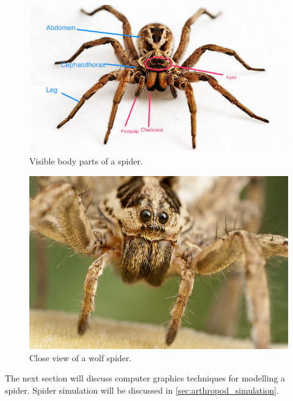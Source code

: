 \begin{figure}[ht!]
\centering
\includegraphics[width=14cm]{figures/partsOfSpider.png}
\caption{Visible body parts of a spider. \protect\footnotemark}
\label{fig:partsOfSpider}
\end{figure}


\begin{figure}[ht!]
\centering
\includegraphics[width=14cm]{figures/wolfspidereyes.jpg}
\caption{Close view of a wolf spider. \protect\footnotemark}
\label{fig:closeViewSpider}
\end{figure}


The next section will discuss computer graphics techniques for modelling a spider. Spider simulation will be discussed in \ref{sec:arthropod_simulation}.


